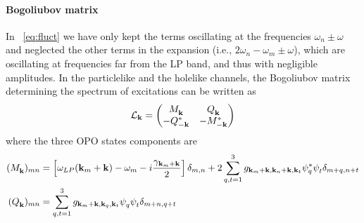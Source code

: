 \paragraph{Bogoliubov matrix}
In ~\eqref{eq:fluct} we have only kept the terms oscillating at the
frequencies $\omega_n \pm \omega$ and neglected the other terms in the
expansion (i.e., $2\omega_n - \omega_m \pm \omega$), which are
oscillating at frequencies far from the LP band, and thus with
negligible amplitudes.
%
In the particlelike and the holelike channels, the Bogoliubov matrix
determining the spectrum of excitations can be written
as~\cite{Wouters_2007}
%
\begin{equation}\label{eq:bogoliubov-opo}
  \mathcal{L}_{\mathbf{k}} = \begin{pmatrix} M_{\mathbf{k}}^{} & Q_{\mathbf{k}}^{}
    \\ -Q_{-\mathbf{k}}^* & -M_{-\mathbf{k}}^* \end{pmatrix}
\end{equation}
%
where the three OPO states components are
%
\begin{align}
  (M_{\vt{k}}^{})_{mn} &= \left[\omega_{LP}({\vt{k}_m + \vt{k}})
    - \omega_m - i\frac{\gamma_{\vt{k}_m + \vt{k}}}{2}\right]
  \delta_{m,n}
   + 2\sum_{q,t=1}^3
  g_{\vt{k}_m+\vt{k},\vt{k}_n+\vt{k},\vt{k}_t} \psi_q^*
  \psi_t^{} \delta_{m+q,n+t}\nonumber\\
%
  (Q_{\vt{k}}^{})_{mn} &= \sum_{q,t=1}^3
  g_{\vt{k}_m+\vt{k},\vt{k}_q,\vt{k}_t} \psi_q^{} \psi_t^{}
  \delta_{m+n,q+t}
\end{align}

